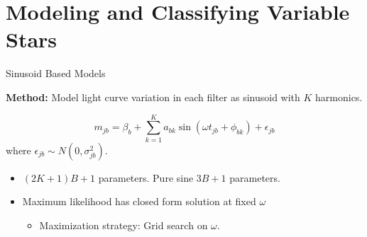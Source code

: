 \documentclass[12pt]{beamer}
\begin{document}










\section{Modeling and Classifying Variable Stars}



\begin{frame}{Sinusoid Based Models}

\textbf{Method:} Model light curve variation in each filter as sinusoid with $K$ harmonics. \cite{mondrik2015multiband,zechmeister2009generalised,lomb1976least,scargle1982studies,schwarzenberg1996fast}

\begin{equation*}
m_{jb} = \beta_b + \sum_{k=1}^K a_{bk}\sin(\omega t_{jb} + \phi_{bk}) + \epsilon_{jb}
\end{equation*}
where $\epsilon_{jb} \sim N(0,\sigma_{jb}^2)$.

\begin{itemize}
\item $(2K + 1)B + 1$ parameters. Pure sine $3B + 1$ parameters.
\item Maximum likelihood has closed form solution at fixed $\omega$
\begin{itemize}
\item Maximization strategy: Grid search on $\omega$.
\end{itemize}
\end{itemize}

\end{frame}
\end{document}
